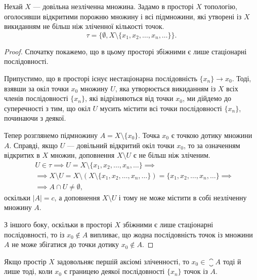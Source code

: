 \begin{example}
Нехай $X$ --- довільна незліченна множина.
Задамо в просторі $X$ топологію, оголосивши відкритими
порожню множину і всі підмножини, які утворені із $X$
викиданням не більш ніж зліченної кількості точок.
\[ \tau = \{ \emptyset, X \setminus \{ x_1, x_2, \ldots, x_n, \ldots\} \}. \]
\end{example}

\begin{proof}
Спочатку покажемо, що в цьому просторі збіжними є
лише стаціонарні послідовності.

Припустимо, що в просторі
існує нестаціонарна послідовність $\{x_n\} \to x_0$. Тоді, взявши за окіл точки $x_0$ множину $U$, яка утворюється
викиданням із $X$ всіх членів послідовності $\{x_n\}$, які
відрізняються від точки $x_0$, ми дійдемо до суперечності з тим,
що окіл $U$ мусить містити всі точки послідовності $\{x_n\}$,
починаючи з деякої.

Тепер розглянемо підмножину $A = X \setminus \{x_0\}$. Точка $x_0$ є
точкою дотику множини $A$. Справді, якщо $U$ --- довільний
відкритий окіл точки $x_0$, то за означенням відкритих в $X$
множин, доповнення $X \setminus U$ є не більш ніж зліченим.
\begin{align*}
& U \in \tau \implies U = X \setminus \{ x_1, x_2, \ldots, x_n, \ldots \} \implies \\
& \implies X \setminus U = X \setminus (X \setminus \{ x_1, x_2, \ldots, x_n, \ldots \}) = \{ x_1, x_2, \ldots, x_n, \ldots \} \implies \\
& \implies A \cap U \ne \emptyset,
\end{align*}
оскільки $|A| = c$, а доповнення $X \setminus U$ і
тому не може містити в собі незліченну множину $A$.

З іншого боку, оскільки в просторі $X$ збіжними є лише
стаціонарні послідовності, то із $x_0 \notin A$ випливає, що жодна
послідовність точок із множини $A$ не може збігатися до
точки дотику $x_0 \notin A$.
\end{proof}

\begin{theorem}
Якщо простір $X$ задовольняє першій аксіомі
зліченності, то $x_0 \in \closure{A}$ тоді й лише тоді, коли $x_0$ є границею
деякої послідовності $\{x_n\}$ точок із $A$.
\end{theorem}

